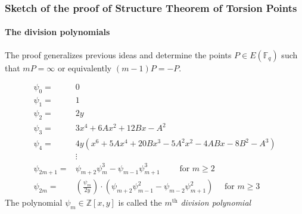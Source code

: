 \documentclass[10pt,handout]{beamer}%
\newcommand{\F}{\mathbb F}
\theoremstyle{definition}
\begin{document}
\begin{frame}\frametitle{Sketch of the proof of Structure Theorem of Torsion Points}
\framesubtitle{The division polynomials}\pause

The proof generalizes previous ideas and determine the points $P\in E(\F_q)$ such that
$mP=\infty$ or equivalently $(m-1)P=-P$.


\begin{Definition}[Division Polynomials of $E:y^2=x^3+Ax+B$ ($p>3$)]\vspace*{-0.7cm}
\begin{align*}
        \psi_{0} =& 0\\
        \psi_{1} =& 1\\
        \psi_{2} =& 2y\\
        \psi_{3} =& 3x^{4} + 6Ax^{2} + 12Bx - A^{2}\\
        \psi_{4} =& 4y(x^{6} + 5Ax^{4} + 20Bx^{3} - 5A^{2}x^{2} - 4ABx - 8B^{2} - A^{3}) \\
        &\vdots\\
        \psi_{2m+1} =& \psi_{m+2}\psi_{m}^{3}-\psi_{m-1}\psi^{3}_{m+1} \qquad \text{ for } m \geq 2\\
        \psi_{2m}  =& \left(\frac{\psi_{m}}{2y}\right)\cdot(\psi_{m+2}\psi^{2}_{m-1}-\psi_{m-2}\psi^{2}_{m+1}) \quad \text{ for } m \geq 3
\end{align*}
The polynomial $\psi_m\in{\mathbb Z}[x,y]$ is called the $m^{\text{th}}$ \emph{division polynomial}
\end{Definition}

\end{frame}
\end{document}
